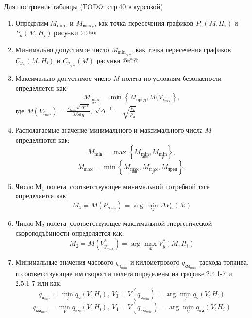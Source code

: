 Для построение таблицы (TODO: стр 40 в курсовой)

\begin{enumerate}
    \item Определим $M_{{\min}_P}$ и $M_{{\max}_P}$, как точка пересечения
        графиков $P_n(M, H_i)$ и $P_p(M, H_i)$ рисунки @@@ 
    \item Минимально допустимое число $M_{{\min}_{доп}}$, как точка пересечения
        графиков $C_{y_n}(M, H_i)$ и $C_{y_{доп}}(M)$ рисунки @@@
    \item Максимально допустимое число $M$ полета по условиям безопасности 
        определяется как: 
    \[
        M_{{\max}_{доп}} = \min \left\{ M_{пред}, M(V_{i_{\max}} \right\},
    \]
    где $M(V_{i_{\max}}) = \frac{V_{i_{\max}} \sqrt{\Delta^{-1}}}{3.6 a_H}$, 
    $\sqrt{\Delta^{-1}} = \sqrt{\frac{\rho_0}{\rho_H}}$
    \item Располагаемые значение минимального и максимального числа $M$
определяются как: 
\[
    M_{\min} = \max \left\{ M_{{\min}_{доп}}, M_{{\min}_P} \right\},
\]
\[
    M_{\max} = \min \left\{ M_{{\max}_{доп}}, M_{{\max}_P}, M_{пред} \right\},
\]
    \item Число $М_1$ полета, соответствующее минимальной потребной тяге
        определяется как:
        \[
            M_1 = M(P_{n_{\min}}) = \arg \min_{M} \Delta P_n (M)
        \]
    \item Число $М_2$ полета, соответствующее максимальной энергетической скороподъёмности
определяется как:
        \[
            M_2 = M(V_{y_{max}}^*) = \arg \max_{M} V_y^* (M, H_i)
        \]
    \item Минимальные значения часового $q_{ч_{min}}$ и километрового
        $q_{км_{min}}$ расхода топлива, и соответствующие им скорости полета
        определены на графике 2.4.1-7 и 2.5.1-7 или как:
        \[
            q_{ч_{min}} = \min_V q_ч(V, H_i), \, V_3 = V(q_{ч_{min}}) =
            \arg \min_V q_ч (V, H_i)
        \]
        \[
            q_{{км}_{min}} = \min_V q_{км}(V, H_i), \, V_4 = V(q_{{км}_{min}}) =
            \arg \min_V q_{км} (V, H_i)
        \]

\end{enumerate}


